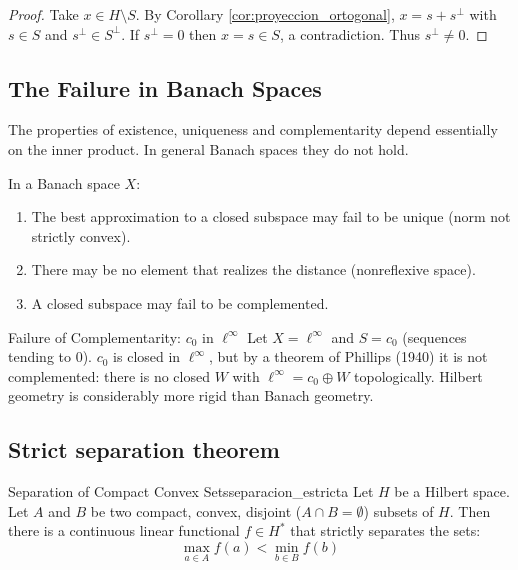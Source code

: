 \documentclass[11pt, a4paper]{article}
\begin{document}
\begin{proof}
Take $x \in H \setminus S$. By Corollary \ref{cor:proyeccion_ortogonal}, $x = s + s^\perp$ with $s \in S$ and
$s^\perp \in S^\perp$. If $s^\perp = 0$ then $x = s \in S$, a contradiction. Thus
$s^\perp \ne 0$.
\end{proof}

\subsection{The Failure in Banach Spaces}

The properties of existence, uniqueness and complementarity depend essentially on the inner
product. In general Banach spaces they do not hold.

\obs In a Banach space $X$:
\begin{enumerate}
    \item The best approximation to a closed subspace may fail to be unique (norm not
    strictly convex).
    \item There may be no element that realizes the distance (nonreflexive space).
    \item A closed subspace may fail to be complemented.
\end{enumerate}


\begin{ejemplo}{Failure of Complementarity: $c_0$ in $\ell^\infty$}{}
Let $X = \ell^\infty$ and $S = c_0$ (sequences tending to 0). $c_0$ is closed in $\ell^\infty$,
but by a theorem of Phillips (1940) it is not complemented: there is no closed $W$ with
$\ell^\infty = c_0 \oplus W$ topologically. Hilbert geometry is considerably more
rigid than Banach geometry.
\end{ejemplo}

\subsection{Strict separation theorem}

\begin{teorema}{Separation of Compact Convex Sets}{separacion_estricta}
Let $H$ be a Hilbert space. Let $A$ and $B$ be two compact, convex, disjoint
($A \cap B = \emptyset$) subsets of $H$.
Then there is a continuous linear functional $f \in H^*$ that strictly separates the sets:
$$ \max_{a \in A} f(a) < \min_{b \in B} f(b) $$
\end{teorema}
\end{document}
